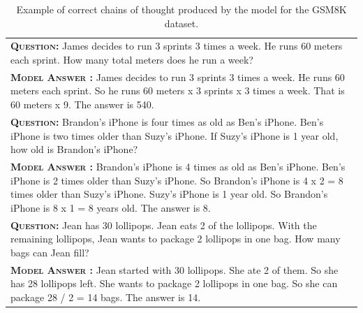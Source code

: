 \documentclass[]{article}
\theoremstyle{plain}
\theoremstyle{definition}
\theoremstyle{remark}
\begin{document}
\begingroup
\begin{table}[h]
    \caption{
    Example of correct chains of thought produced by the model for the GSM8K dataset.
    }
    \vspace{1mm}
    \centering
    \small
    \begin{tabular}{p{\linewidth}}
        \toprule
        \vspace{-2mm}
        \textbf{\textsc{Question:}} James decides to run 3 sprints 3 times a week.  He runs 60 meters each sprint.  How many total meters does he run a week? \\
        \vspace{-1mm}
        \textbf{\textsc{Model Answer \color{darkGreen}{(CORRECT)}:}} James decides to run 3 sprints 3 times a week. He runs 60 meters each sprint. So he runs 60 meters x 3 sprints x 3 times a week. That is 60 meters x 9. The answer is 540. \color{darkGreen}{\checkmark} \\
        \midrule
        \vspace{-2mm}
        \textbf{\textsc{Question:}} Brandon's iPhone is four times as old as Ben's iPhone. Ben's iPhone is two times older than Suzy's iPhone. If Suzy’s iPhone is 1 year old, how old is Brandon’s iPhone? \\
        \vspace{-1mm}
        \textbf{\textsc{Model Answer \color{darkGreen}{(CORRECT)}:}} Brandon's iPhone is 4 times as old as Ben's iPhone. Ben's iPhone is 2 times older than Suzy's iPhone. So Brandon's iPhone is 4 x 2 = 8 times older than Suzy's iPhone. Suzy's iPhone is 1 year old. So Brandon's iPhone is 8 x 1 = 8 years old. The answer is 8. \color{darkGreen}{\checkmark} \\
        \midrule
        \vspace{-2mm}
        \textbf{\textsc{Question:}} Jean has 30 lollipops. Jean eats 2 of the lollipops. With the remaining lollipops, Jean wants to package 2 lollipops in one bag. How many bags can Jean fill? \\
        \vspace{-1mm}
        \textbf{\textsc{Model Answer \color{darkGreen}{(CORRECT)}:}} Jean started with 30 lollipops. She ate 2 of them. So she has 28 lollipops left. She wants to package 2 lollipops in one bag. So she can package 28 / 2 = 14 bags. The answer is 14. \color{darkGreen}{\checkmark} \\
        \bottomrule
    \end{tabular}
    \label{tab:appendix-gsm8k-correct-examples}
\end{table}
\endgroup
\end{document}
